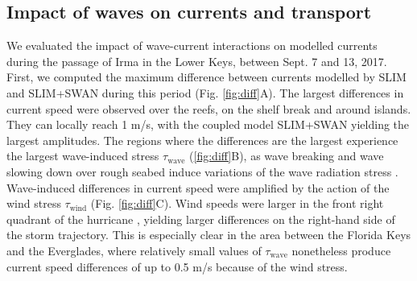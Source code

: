 \documentclass[11pt,a4paper]{article}
\begin{document}
\subsection{Impact of waves on currents and transport}

We evaluated the impact of wave-current interactions on modelled currents during the passage of Irma in the Lower Keys, between Sept. 7 and 13, 2017. First, we computed the maximum difference between currents modelled by SLIM and SLIM+SWAN during this period (Fig. \ref{fig:diff}A). The largest differences in current speed were observed over the reefs, on the shelf break and around islands. They can locally reach 1 m/s, with the coupled model SLIM+SWAN yielding the largest amplitudes. The regions where the differences are the largest experience the largest wave-induced stress {\boldmath$\tau$}$_\text{wave}$ (\ref{fig:diff}B), as wave breaking and wave slowing down over rough seabed induce variations of the wave radiation stress \citep{longuet1964radiation}. Wave-induced differences in current speed were amplified by the action of the wind stress {\boldmath$\tau$}$_\text{wind}$ (Fig. \ref{fig:diff}C). Wind speeds were larger in the front right quadrant of the hurricane \citep{zedler2009ocean}, yielding larger differences on the right-hand side of the storm trajectory. This is especially clear in the area between the Florida Keys and the Everglades, where relatively small values of {\boldmath$\tau$}$_\text{wave}$ nonetheless produce current speed differences of up to 0.5 m/s because of the wind stress.
\end{document}
